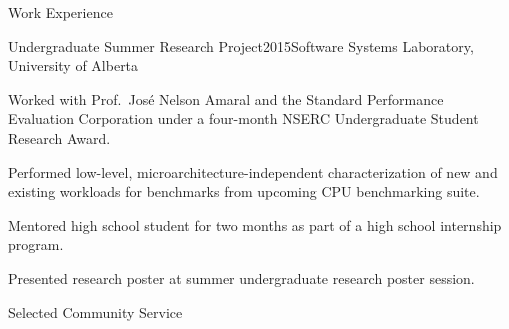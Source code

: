 \documentclass{cv}
\begin{document}
\begin{rSection}{Work Experience}
\begin{rSubsection}{Undergraduate Summer Research Project}{2015}{Software Systems Laboratory, University of Alberta}
\item Worked with Prof.~Jos{\'{e}} Nelson Amaral and the Standard Performance Evaluation Corporation under a four-month NSERC Undergraduate Student Research Award.
\item Performed low-level, microarchitecture-independent characterization of new and existing workloads for benchmarks from upcoming CPU benchmarking suite.
\item Mentored high school student for two months as part of a high school internship program.
\item Presented research poster at summer undergraduate research poster session.
\end{rSubsection}

\end{rSection}


\begin{rSection}{Selected Community Service}

 \vspace{0.15em}\\
 \vspace{0.15em}\\
 \vspace{0.15em}\\
 \vspace{0.15em}\\
 \vspace{0.15em}\\
 \vspace{0.15em}\\
 \vspace{0.15em}

\end{rSection}
\end{document}
